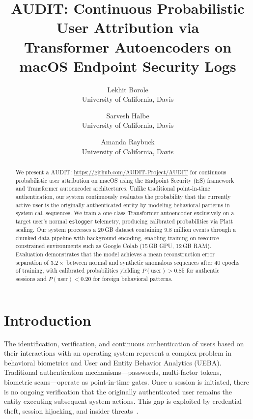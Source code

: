 \documentclass[letterpaper,twocolumn,10pt]{article}
\title{\Large \bf AUDIT: Continuous Probabilistic User Attribution via\\
Transformer Autoencoders on macOS Endpoint Security Logs}
\author{
{\rm Lekhit Borole}\\
University of California, Davis
\and
{\rm Sarvesh Halbe}\\
University of California, Davis
\and
{\rm Amanda Raybuck}\\
University of California, Davis
}
\date{}
\begin{document}
\maketitle
\thispagestyle{empty}


\begin{abstract}
We present a AUDIT: \href{https://github.com/AUDIT-Project/AUDIT/tree/main}{https://github.com/AUDIT-Project/AUDIT} for continuous probabilistic user attribution
on macOS using the Endpoint Security (ES) framework and Transformer
autoencoder architectures. Unlike traditional point-in-time
authentication, our system continuously evaluates the probability
that the currently active user is the originally authenticated
entity by modeling behavioral patterns in system call sequences.
We train a one-class Transformer autoencoder exclusively on a
target user's normal \texttt{eslogger} telemetry, producing
calibrated probabilities via Platt scaling. Our system processes
a 20\,GB dataset containing 9.8 million events through a chunked
data pipeline with background encoding, enabling training on
resource-constrained environments such as Google Colab (15\,GB
GPU, 12\,GB RAM). Evaluation demonstrates that the model achieves
a mean reconstruction error separation of $3.2\times$ between
normal and synthetic anomalous sequences after 40 epochs of
training, with calibrated probabilities yielding
$P(\text{user}) > 0.85$ for authentic sessions and
$P(\text{user}) < 0.20$ for foreign behavioral patterns.
\end{abstract}


\section{Introduction}

The identification, verification, and continuous authentication of
users based on their interactions with an operating system represent
a complex problem in behavioral biometrics and User and Entity
Behavior Analytics (UEBA). Traditional authentication
mechanisms---passwords, multi-factor tokens, biometric
scans---operate as point-in-time gates. Once a session is
initiated, there is no ongoing verification that the originally
authenticated user remains the entity executing subsequent system
actions. This gap is exploited by credential theft, session
hijacking, and insider threats~\cite{deeplog,loginspect}.
\end{document}
